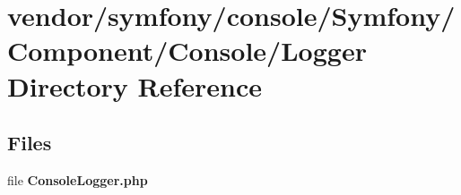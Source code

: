 \section{vendor/symfony/console/\+Symfony/\+Component/\+Console/\+Logger Directory Reference}
\label{dir_fed640bb4edb3922c82e31ce856453f9}
\subsection*{Files}
\begin{DoxyCompactItemize}
\item 
file {\bf Console\+Logger.\+php}
\end{DoxyCompactItemize}
